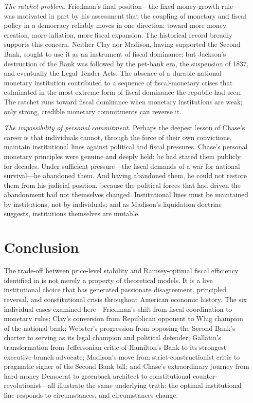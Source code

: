 \documentclass[12pt]{article}
\begin{document}
\textit{The ratchet problem.}  Friedman's final position---the fixed
money-growth rule---was motivated in part by his assessment that the
coupling of monetary and fiscal policy in a democracy reliably moves
in one direction: toward more money creation, more inflation, more
fiscal expansion.  The historical record broadly supports this concern.
Neither Clay nor Madison, having supported the Second Bank, sought to
use it as an instrument of fiscal dominance; but Jackson's destruction
of the Bank was followed by the pet-bank era, the suspension of 1837,
and eventually the Legal Tender Acts.  The absence of a durable national
monetary institution contributed to a sequence of fiscal-monetary crises
that culminated in the most extreme form of fiscal dominance the republic
had seen.  The ratchet runs toward fiscal dominance when monetary
institutions are weak; only strong, credible monetary commitments can
reverse it.

\textit{The impossibility of personal commitment.}  Perhaps the deepest
lesson of Chase's career is that individuals cannot, through the force
of their own convictions, maintain institutional lines against political
and fiscal pressures.  Chase's personal monetary principles were
genuine and deeply held; he had stated them publicly for decades.
Under sufficient pressure---the fiscal demands of a war for national
survival---he abandoned them.  And having abandoned them, he could not
restore them from his judicial position, because the political forces
that had driven the abandonment had not themselves changed.
Institutional lines must be maintained by institutions, not by
individuals; and as Madison's liquidation doctrine suggests, institutions
themselves are mutable.


\section{Conclusion}

The trade-off between price-level stability and Ramsey-optimal fiscal
efficiency identified in \citet{Sargent2011} is not merely a property of
theoretical models.  It is a live institutional choice that has generated
passionate disagreement, principled reversal, and constitutional crisis
throughout American economic history.  The six individual cases examined
here---Friedman's shift from fiscal coordination to monetary rules;
Clay's conversion from Republican opponent to Whig champion of the
national bank; Webster's progression from opposing the Second Bank's
charter to serving as its legal champion and political defender;
Gallatin's transformation from Jeffersonian critic of Hamilton's Bank to
its strongest executive-branch advocate; Madison's move from
strict-constructionist critic to pragmatic signer of the Second Bank
bill; and Chase's extraordinary journey from hard-money Democrat to
greenback architect to constitutional counter-revolutionist---all
illustrate the same underlying truth: the optimal institutional line
responds to circumstances, and circumstances change.
\end{document}
